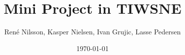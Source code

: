 \documentclass[]{report}
\begin{document}
\title{Mini Project in TIWSNE}
\author{Ren\'e Nilsson, Kasper Nielsen, Ivan Grujic, Lasse Pedersen}
\date{\today}
\maketitle
{}


\end{document}
